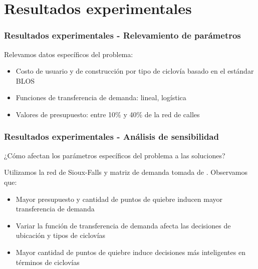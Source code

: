 \documentclass[aspectratio=43, 10pt]{beamer}
\begin{document}
\section{Resultados experimentales}

\begin{frame}
    \frametitle{Resultados experimentales - Relevamiento de parámetros}

    Relevamos datos específicos del problema:

    \begin{itemize}
        \item{Costo de usuario y de construcción por tipo de ciclovía basado en el estándar BLOS \parencite{blos2007}}
        \item{Funciones de transferencia de demanda: lineal, logística \parencite{shwe2014, ortuz2011}}
        \item{Valores de presupuesto: entre 10\% y 40\% de la red de calles \parencite{rios2015, shwe2014}}
    \end{itemize}
\end{frame}

\begin{frame}
    \frametitle{Resultados experimentales - Análisis de sensibilidad}

    ¿Cómo afectan los parámetros específicos del problema a las soluciones?

    Utilizamos la red de Sioux-Falls y matriz de demanda tomada de \textcite{Liu2019}. Observamos que:

    \begin{itemize}
        \item{Mayor presupuesto y cantidad de puntos de quiebre inducen mayor transferencia de demanda}
        \item{Variar la función de transferencia de demanda afecta las decisiones de ubicación y tipos de ciclovías}
        \item{Mayor cantidad de puntos de quiebre induce decisiones más inteligentes en términos de ciclovías}
    \end{itemize}
\end{frame}
\end{document}
